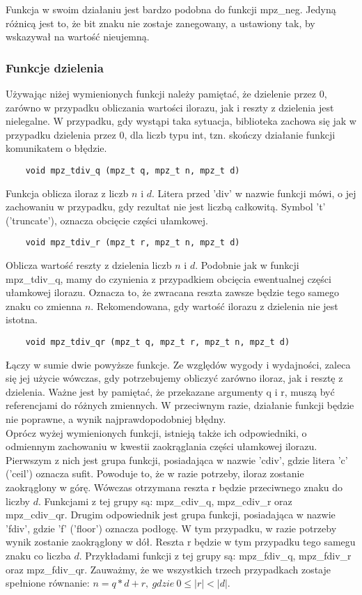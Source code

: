 \documentclass[oneside,a4paper]{book}
\begin{document}
	Funkcja w swoim działaniu jest bardzo podobna do funkcji mpz\_neg. Jedyną różnicą jest to, że bit znaku nie zostaje zanegowany, a ustawiony tak, by wskazywał na wartość nieujemną.
	
	\subsubsection{Funkcje dzielenia}
	Używając niżej wymienionych funkcji należy pamiętać, że dzielenie przez $0$, zarówno w przypadku obliczania wartości ilorazu, jak i reszty z dzielenia jest nielegalne. W przypadku, gdy wystąpi taka sytuacja, biblioteka zachowa się jak w przypadku dzielenia przez $0$, dla liczb typu int, tzn. skończy działanie funkcji komunikatem o błędzie.
	
	\begin{lstlisting}
	void mpz_tdiv_q (mpz_t q, mpz_t n, mpz_t d)
	\end{lstlisting}
	
	Funkcja oblicza iloraz z liczb $n$ i $d$. Litera przed 'div' w nazwie funkcji mówi, o jej zachowaniu w przypadku, gdy rezultat nie jest liczbą całkowitą. Symbol 't' ('truncate'), oznacza obcięcie części ułamkowej.
	
	\begin{lstlisting}
	void mpz_tdiv_r (mpz_t r, mpz_t n, mpz_t d)
	\end{lstlisting}
	
	Oblicza wartość reszty z dzielenia liczb $n$ i $d$. Podobnie jak w funkcji mpz\_tdiv\_q, mamy do czynienia z przypadkiem obcięcia ewentualnej części ułamkowej ilorazu. Oznacza to, że zwracana reszta zawsze będzie tego samego znaku co zmienna $n$. Rekomendowana, gdy wartość ilorazu z dzielenia nie jest istotna.
	
	\begin{lstlisting}
	void mpz_tdiv_qr (mpz_t q, mpz_t r, mpz_t n, mpz_t d)
	\end{lstlisting}
	
	Łączy w sumie dwie powyższe funkcje. Ze względów wygody i wydajności, zaleca się jej użycie wówczas, gdy potrzebujemy obliczyć zarówno iloraz, jak i resztę z dzielenia. Ważne jest by pamiętać, że przekazane argumenty q i r, muszą być referencjami do różnych zmiennych. W przeciwnym razie, działanie funkcji będzie nie poprawne, a wynik najprawdopodobniej błędny.\\
	Oprócz wyżej wymienionych funkcji, istnieją także ich odpowiedniki, o odmiennym zachowaniu w kwestii zaokrąglania części ułamkowej ilorazu. Pierwszym z nich jest grupa funkcji, posiadająca w nazwie 'cdiv', gdzie litera 'c' ('ceil') oznacza sufit. Powoduje to, że w razie potrzeby, iloraz zostanie zaokrąglony w górę. Wówczas otrzymana reszta r będzie przeciwnego znaku do liczby $d$. Funkcjami z tej grupy są: mpz\_cdiv\_q, mpz\_cdiv\_r oraz mpz\_cdiv\_qr. Drugim odpowiednik jest grupa funkcji, posiadająca w nazwie 'fdiv', gdzie 'f' ('floor') oznacza podłogę. W tym przypadku, w razie potrzeby wynik zostanie zaokrąglony w dół. Reszta r będzie w tym przypadku tego samegu znaku co liczba $d$. Przykładami funkcji z tej grupy są: mpz\_fdiv\_q, mpz\_fdiv\_r oraz mpz\_fdiv\_qr. Zauważmy, że we wszystkich trzech przypadkach zostaje spełnione równanie: $n = q*d+r,\ gdzie\ 0 \le |r| < |d|.$
	
\end{document}
